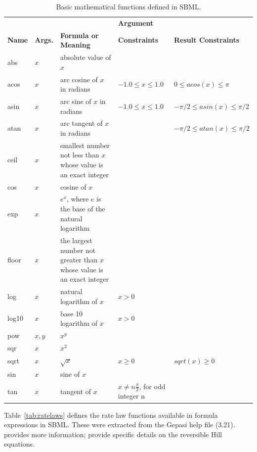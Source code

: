 \documentclass[10pt]{cekarticle}
\begin{document}
\begin{table}[hb]
  \begin{center}
    \begin{tabular}{@{}p{1cm}p{0.8cm}p{5cm}p{4cm}p{3.8cm}@{}}
      \toprule
      &                &                             & \textbf{Argument} \\
      \textbf{Name} & \textbf{Args.} & \textbf{Formula or Meaning} & \textbf{Constraints} & \textbf{Result Constraints} \\
      \midrule
      abs   & $x$ & absolute value of $x$\\
      acos  & $x$ & arc cosine of $x$ in radians & $-1.0 \leq x \leq 1.0$ & $0 \leq acos(x) \leq \pi$ \\
      asin  & $x$ & arc sine of $x$ in radians & $-1.0 \leq x \leq 1.0$ & $-\pi/2 \leq asin(x) \leq \pi/2$ \\
      atan  & $x$ & arc tangent of $x$ in radians & & $-\pi/2 \leq atan(x) \leq \pi/2$ \\
      ceil  & $x$ & smallest number not less than $x$ whose value is an exact integer \\
      cos   & $x$ & cosine of $x$ \\
      exp   & $x$ & $e^x$, where $e$ is the base of the natural logarithm\\
      floor & $x$ & the largest number not greater than $x$ whose value is an exact integer \\
      log   & $x$ & natural logarithm of $x$ & $x > 0$ \\
      log10 & $x$ & base 10 logarithm of $x$ & $x > 0$ \\
      pow   & $x, y$ & $x^y$ \\
      sqr   & $x$ & $x^2$ \\
      sqrt  & $x$ & $\sqrt{x}$ & $x \geq 0$ & $sqrt(x) \geq 0$ \\
      sin   & $x$ & sine of $x$ \\
      tan   & $x$ & tangent of $x$ & $x \neq n \frac{\pi}{2}$, for odd integer n\\
      \bottomrule
    \end{tabular}
  \end{center}
  \caption{Basic mathematical functions defined in SBML.}
  \label{tab:simplemath}
\end{table}


Table~\ref{tab:ratelaws} defines the rate law functions available in
formula expressions in SBML.  These were extracted from the Gepasi help
file (3.21).  \citet{segel:1993} provides more information;
\citet{hofmeyr:1997} provide specific details on the reversible Hill
equations.
\end{document}
